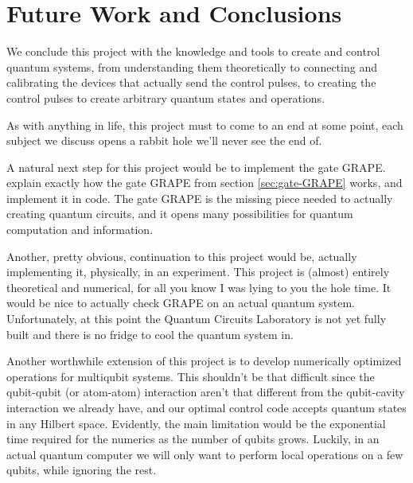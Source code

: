 \chapter{Future Work and Conclusions}
We conclude this project with the knowledge and tools to create and control quantum systems, from understanding them theoretically to connecting and calibrating the devices that actually send the control pulses, to creating the control pulses to create arbitrary quantum states and operations.

As with anything in life, this project must to come to an end at some point, each subject we discuss opens a rabbit hole we'll never see the end of.

A natural next step for this project would be to implement the gate GRAPE. explain exactly how the gate GRAPE from section \ref{sec:gate-GRAPE} works, and implement it in code. The gate GRAPE is the missing piece needed to actually creating quantum circuits, and it opens many possibilities for quantum computation and information.

Another, pretty obvious, continuation to this project would be, actually implementing it, physically, in an experiment. This project is (almost) entirely theoretical and numerical, for all you know I was lying to you the hole time. It would be nice to actually check GRAPE on an actual quantum system. Unfortunately, at this point the Quantum Circuits Laboratory is not yet fully built and there is no fridge to cool the quantum system in.

 Another worthwhile extension of this project is to develop numerically optimized operations for multiqubit systems. This shouldn't be that difficult since the qubit-qubit (or atom-atom) interaction aren't that different from the qubit-cavity interaction we already have, and our optimal control code accepts quantum states in any Hilbert space. Evidently, the main limitation would be the exponential time required for the numerics as the number of qubits grows. Luckily, in an actual quantum computer we will only want to perform local operations on a few qubits, while ignoring the rest. 

